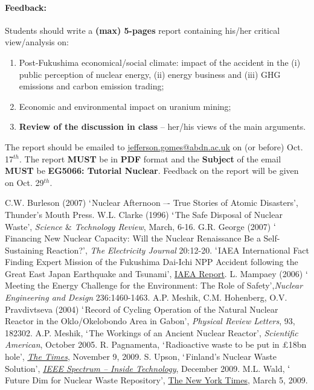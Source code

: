 \documentclass[14pt,twoside]{article}
\begin{document}
\paragraph{Feedback:} Students should write a {\bf (max) 5-pages} report containing his/her critical view/analysis on:
\begin{enumerate}
\item Post-Fukushima economical/social climate: impact of the accident in the (i) public perception of nuclear energy, (ii) energy business and (iii) GHG emissions and carbon emission trading;  
\item Economic and environmental impact on uranium mining;
\item {\bf Review of the discussion in class} -- her/his views of the main arguments.
\end{enumerate} 
The report should be emailed to \href{mailto:jefferson.gomes@abdn.ac.uk}{jefferson.gomes@abdn.ac.uk} on (or before) Oct. 17$^{th}$. The report {\bf MUST} be in {\bf PDF} format and the {\bf Subject} of the email {\bf MUST} be {\bf EG5066: Tutorial Nuclear}. Feedback on the report will be given on Oct. 29$^{th}$.


\begin{thebibliography}{99}
 C.W. Burleson (2007) $\lq$Nuclear Afternoon –- True Stories of Atomic Disasters', Thunder’s Mouth Press.
 W.L. Clarke (1996) $\lq$The Safe Disposal of Nuclear Waste', {\it Science $\&$ Technology Review}, March, 6-16.
 G.R. George (2007) $\lq$Financing New Nuclear Capacity: Will the Nuclear Renaissance Be a Self-Sustaining Reaction?', {\it The Electricity Journal} 20:12-20.
 $\lq$IAEA International Fact Finding Expert Mission of the Fukushima Dai-Ichi NPP Accident following the Great East Japan Earthquake and Tsunami', \href{http://www-pub.iaea.org/MTCD/meetings/PDFplus/2011/cn200/documentation/cn200_Final-Fukushima-Mission_Report.pdf}{IAEA Report}.
 L. Mampaey (2006) $\lq$Meeting the Energy Challenge for the Environment: The Role of Safety',{\it  Nuclear Engineering and Design} 236:1460-1463.
 A.P. Meshik, C.M. Hohenberg, O.V. Pravdivtseva (2004) $\lq$Record of Cycling Operation of the Natural Nuclear Reactor in the Oklo/Okelobondo Area in Gabon', {\it Physical Review Letters}, 93, 182302.
 A.P. Meshik, $\lq$The Workings of an Ancient Nuclear Reactor', {\it Scientific American}, October 2005.
 R. Pagnamenta, $\lq$Radioactive waste to be put in £18bn hole', \href{http://www.timesonline.co.uk/tol/news/politics/article6908914.ece}{\it The Times}, November 9, 2009.
 S. Upson, $\lq$Finland’s Nuclear Waste Solution', \href{http://spectrum.ieee.org/energy/nuclear/finlands-nuclear-waste-solution}{\it IEEE Spectrum – Inside Technology}, December 2009.
 M.L. Wald, $\lq$Future Dim for Nuclear Waste Repository', \href{http://www.nytimes.com/2009/03/06/science/earth/06yucca.html?_r=1}{The New York Times}, March 5, 2009.
\end{thebibliography}

\clearpage

   
\end{document}
